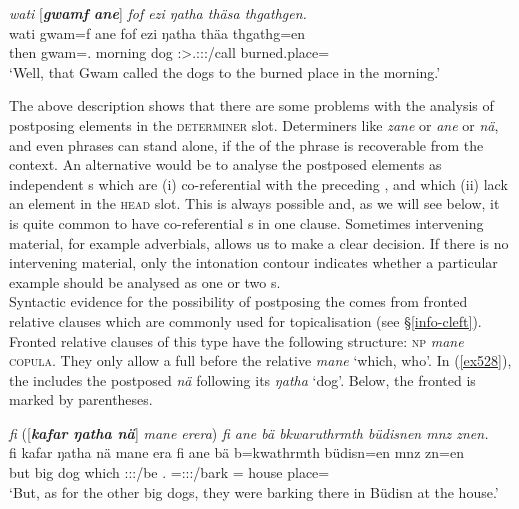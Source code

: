 \begin{exe}
	\ex \emph{wati} [\emph{\textbf{gwamf ane}}] \emph{fof ezi ŋatha thäsa thgathgen.}\\
	\gll wati gwam=f ane fof ezi ŋatha thäa thgathg=en\\
	then gwam=\Erg.\Sg{} \Dem{} \Emph{} morning dog \Stsg:\Sbj>\Tsg.\Masc:\Obj:\Pst:\Pfv/call {burned.place=\Loc}\\
	\trans `Well, that Gwam called the dogs to the burned place in the morning.'\\
	\label{ex523}
\end{exe}

The above description shows that there are some problems with the analysis of postposing elements in the \textsc{determiner} slot. Determiners like \emph{zane} or \emph{ane} or \emph{nä}, and even  phrases can stand alone, if the  of the phrase is recoverable from the context. An alternative would be to analyse the postposed elements as independent s which are (i) co-referential with the preceding , and which (ii) lack an element in the \textsc{head} slot. This is always possible and, as we will see below, it is quite common to have co-referential s in one clause. Sometimes intervening material, for example adverbials, allows us to make a clear decision. If there is no intervening material, only the intonation contour indicates whether a particular example should be analysed as one or two s.\\

Syntactic evidence for the possibility of postposing the  comes from fronted relative clauses which are commonly used for topicalisation (see \S{}\ref{info-cleft}). Fronted relative clauses of this type have the following structure: \textsc{np} \emph{mane} \textsc{copula}. They only allow a full  before the relative  \emph{mane} `which, who'. In (\ref{ex528}), the  includes the postposed   \emph{nä} following its  \emph{ŋatha} `dog'. Below, the fronted  is marked by parentheses.

\begin{exe}
	\ex \emph{fi} ([\emph{\textbf{kafar ŋatha nä}}] \emph{mane erera}) \emph{fi ane bä bkwaruthrmth büdisnen mnz znen.}\\
	\gll fi kafar ŋatha nä mane era fi ane bä b=kwathrmth büdisn=en mnz zn=en\\
	but big dog \Indf{} which \Stpl:\Sbj:\Pst:\Ipfv/be \Third.\Abs{} \Dem{} \Med{} \Med=\Stpl:\Sbj:\Pst:\Dur/bark \Pl=\Loc{} house place=\Loc\\
	\trans `But, as for the other big dogs, they were barking there in Büdisn at the house.'
	\label{ex528}
\end{exe}

